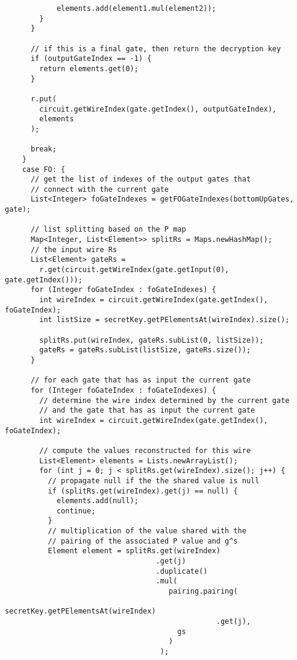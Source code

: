 \documentclass[12pt]{article}
\begin{document}
\begin{lstlisting}
            elements.add(element1.mul(element2));
        }
      }
    
      // if this is a final gate, then return the decryption key
      if (outputGateIndex == -1) {
        return elements.get(0);
      }
    
      r.put(
        circuit.getWireIndex(gate.getIndex(), outputGateIndex), 
        elements
      );
    
      break;
    }
    case FO: {
      // get the list of indexes of the output gates that 
      // connect with the current gate
      List<Integer> foGateIndexes = getFOGateIndexes(bottomUpGates, gate);

      // list splitting based on the P map
      Map<Integer, List<Element>> splitRs = Maps.newHashMap();
      // the input wire Rs
      List<Element> gateRs = 
        r.get(circuit.getWireIndex(gate.getInput(0), gate.getIndex()));
      for (Integer foGateIndex : foGateIndexes) {
        int wireIndex = circuit.getWireIndex(gate.getIndex(), foGateIndex);
        int listSize = secretKey.getPElementsAt(wireIndex).size();

        splitRs.put(wireIndex, gateRs.subList(0, listSize));
        gateRs = gateRs.subList(listSize, gateRs.size());
      }

      // for each gate that has as input the current gate
      for (Integer foGateIndex : foGateIndexes) {
        // determine the wire index determined by the current gate
        // and the gate that has as input the current gate
        int wireIndex = circuit.getWireIndex(gate.getIndex(), foGateIndex);
        
        // compute the values reconstructed for this wire
        List<Element> elements = Lists.newArrayList();
        for (int j = 0; j < splitRs.get(wireIndex).size(); j++) {
          // propagate null if the the shared value is null
          if (splitRs.get(wireIndex).get(j) == null) {
            elements.add(null);
            continue;
          }
          // multiplication of the value shared with the 
          // pairing of the associated P value and g^s
          Element element = splitRs.get(wireIndex)
                                   .get(j)
                                   .duplicate()
                                   .mul(
                                      pairing.pairing(
                                        secretKey.getPElementsAt(wireIndex)
                                                 .get(j), 
                                        gs
                                      )
                                    );
         

\end{lstlisting}
\end{document}
